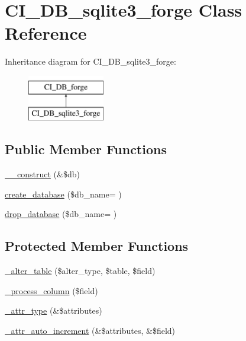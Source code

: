 \hypertarget{class_c_i___d_b__sqlite3__forge}{}\section{C\+I\+\_\+\+D\+B\+\_\+sqlite3\+\_\+forge Class Reference}
\label{class_c_i___d_b__sqlite3__forge}
Inheritance diagram for C\+I\+\_\+\+D\+B\+\_\+sqlite3\+\_\+forge\+:\begin{figure}[H]
\begin{center}
\leavevmode
\includegraphics[height=2.000000cm]{class_c_i___d_b__sqlite3__forge}
\end{center}
\end{figure}
\subsection*{Public Member Functions}
\begin{DoxyCompactItemize}
\item 
\hyperlink{class_c_i___d_b__sqlite3__forge_aaf2ef772755ec6f361d44e16cc9ffd69}{\+\_\+\+\_\+construct} (\&\$db)
\item 
\hyperlink{class_c_i___d_b__sqlite3__forge_a1c08a5b4e951f158b791fedd680ba187}{create\+\_\+database} (\$db\+\_\+name= \textquotesingle{}\textquotesingle{})
\item 
\hyperlink{class_c_i___d_b__sqlite3__forge_a9e0a4706cac7e0bb62e76f23081000d4}{drop\+\_\+database} (\$db\+\_\+name= \textquotesingle{}\textquotesingle{})
\end{DoxyCompactItemize}
\subsection*{Protected Member Functions}
\begin{DoxyCompactItemize}
\item 
\hyperlink{class_c_i___d_b__sqlite3__forge_a41c6cae02f2fda8b429ad0afb9509426}{\+\_\+alter\+\_\+table} (\$alter\+\_\+type, \$table, \$field)
\item 
\hyperlink{class_c_i___d_b__sqlite3__forge_a8f38f1c5b5dddecca4befbe393f3f299}{\+\_\+process\+\_\+column} (\$field)
\item 
\hyperlink{class_c_i___d_b__sqlite3__forge_a8553be952084c6f7cdfff370a1d14f6b}{\+\_\+attr\+\_\+type} (\&\$attributes)
\item 
\hyperlink{class_c_i___d_b__sqlite3__forge_a2a013a5932439c3c44f0dad3436525f7}{\+\_\+attr\+\_\+auto\+\_\+increment} (\&\$attributes, \&\$field)
\end{DoxyCompactItemize}
